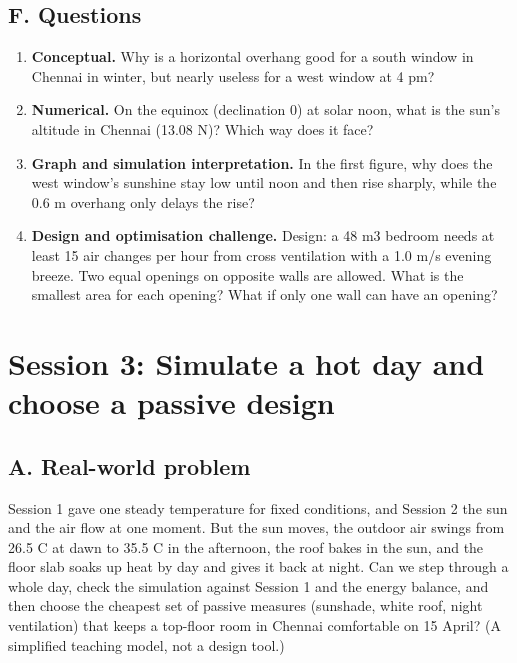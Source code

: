 \documentclass[11pt,a4paper]{article}
\begin{document}
\subsection*{F. Questions}
\begin{enumerate}[nosep]
\item \textbf{Conceptual.} Why is a horizontal overhang good for a south window in Chennai in winter, but nearly useless for a west window at 4 pm?
\item \textbf{Numerical.} On the equinox (declination 0) at solar noon, what is the sun's altitude in Chennai (13.08 N)? Which way does it face?
\item \textbf{Graph and simulation interpretation.} In the first figure, why does the west window's sunshine stay low until noon and then rise sharply, while the 0.6 m overhang only delays the rise?
\item \textbf{Design and optimisation challenge.} Design: a 48 m3 bedroom needs at least 15 air changes per hour from cross ventilation with a 1.0 m/s evening breeze. Two equal openings on opposite walls are allowed. What is the smallest area for each opening? What if only one wall can have an opening?
\end{enumerate}

\section{Session 3: Simulate a hot day and choose a passive design}

\subsection*{A. Real-world problem}
Session 1 gave one steady temperature for fixed conditions, and Session 2 the sun and the air flow at one moment. But the sun moves, the outdoor air swings from 26.5 C at dawn to 35.5 C in the afternoon, the roof bakes in the sun, and the floor slab soaks up heat by day and gives it back at night. Can we step through a whole day, check the simulation against Session 1 and the energy balance, and then choose the cheapest set of passive measures (sunshade, white roof, night ventilation) that keeps a top-floor room in Chennai comfortable on 15 April? (A simplified teaching model, not a design tool.)
\end{document}
